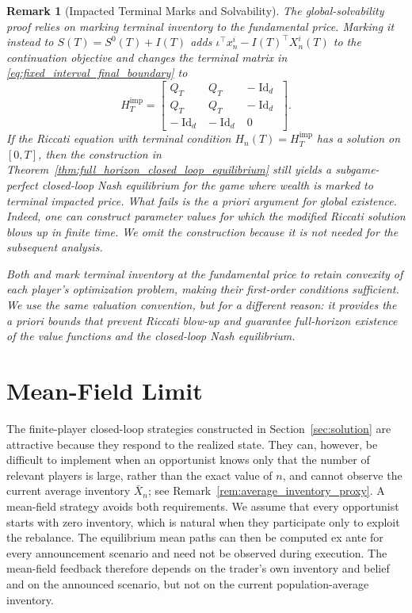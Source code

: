 \documentclass[12pt]{article}
\numberwithin{equation}{section}
\newtheorem{remark}[theorem]{Remark}
\theoremstyle{definition}
\begin{document}
\begin{remark}[Impacted Terminal Marks and Solvability]
\label{rem:impacted_terminal_mark_solvability}
The global-solvability proof relies on marking terminal inventory to the
fundamental price. Marking it instead to \(S(T)=S^0(T)+I(T)\) adds
\(\iota^\top x_n^i-I(T)^\top X_n^i(T)\) to the continuation objective and changes
the terminal matrix in \eqref{eq:fixed_interval_final_boundary} to
\[
H_T^{\mathrm{imp}}
=
\begin{bmatrix}
Q_T&Q_T&-\operatorname{Id}_d\\
Q_T&Q_T&-\operatorname{Id}_d\\
-\operatorname{Id}_d&-\operatorname{Id}_d&0
\end{bmatrix}.
\]
If the Riccati equation with terminal condition
\(H_n(T)=H_T^{\mathrm{imp}}\) has a solution on \([0,T]\), then the
construction in Theorem~\ref{thm:full_horizon_closed_loop_equilibrium} still yields
a subgame-perfect closed-loop Nash equilibrium for the game where wealth is marked
to terminal impacted price. What fails is the a priori
argument for global existence. Indeed, one can construct parameter values for which the modified
Riccati solution blows up in finite time. We omit the construction because it is
not needed for the subsequent analysis.

Both \citet{NeumanVoss2023} and
\citet{campbell2026optimalexecutionntraders} mark terminal inventory at the
fundamental price to retain convexity of each player's optimization problem,
making their first-order conditions sufficient. We use the same valuation
convention, but for a different reason: it provides the a priori bounds that
prevent Riccati blow-up and guarantee full-horizon existence of the value
functions and the closed-loop Nash equilibrium.
\end{remark}

\section{Mean-Field Limit}\label{sec:mean_field_limit}

The finite-player closed-loop strategies constructed in
Section~\ref{sec:solution} are attractive because they respond to the realized
state. They can, however, be difficult to implement when an opportunist knows
only that the number of relevant players is large, rather than the exact value
of \(n\), and cannot observe the current average inventory \(\bar X_n\); see
Remark~\ref{rem:average_inventory_proxy}. A mean-field strategy avoids both
requirements. We assume that every opportunist starts with zero inventory,
which is natural when they participate only to exploit the rebalance. The equilibrium mean paths can then be computed ex
ante for every announcement scenario and need not be observed during execution.
The mean-field feedback therefore depends on the trader's own inventory and
belief and on the announced scenario, but not on the current population-average
inventory.
\end{document}
